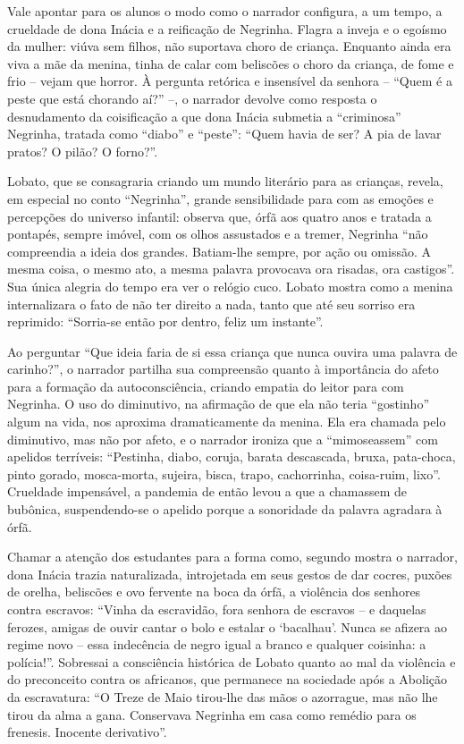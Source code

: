 \documentclass[12pt]{extarticle}
\begin{document}
Vale apontar para os alunos o modo como o narrador configura, a um
tempo, a crueldade de dona Inácia e a reificação de Negrinha. Flagra a
inveja e o egoísmo da mulher: viúva sem filhos, não suportava choro de
criança. Enquanto ainda era viva a mãe da menina, tinha de calar com
beliscões o choro da criança, de fome e frio -- vejam que horror. À
pergunta retórica e insensível da senhora -- ``Quem é a peste que está
chorando aí?'' --, o narrador devolve como resposta o desnudamento da
coisificação a que dona Inácia submetia a ``criminosa'' Negrinha,
tratada como ``diabo'' e ``peste'': ``Quem havia de ser? A pia de lavar
pratos? O pilão? O forno?''.

Lobato, que se consagraria criando um mundo literário para as crianças,
revela, em especial no conto ``Negrinha'', grande sensibilidade para com
as emoções e percepções do universo infantil: observa que, órfã aos
quatro anos e tratada a pontapés, sempre imóvel, com os olhos assustados
e a tremer, Negrinha ``não compreendia a ideia dos grandes. Batiam-lhe
sempre, por ação ou omissão. A mesma coisa, o mesmo ato, a mesma palavra
provocava ora risadas, ora castigos''. Sua única alegria do tempo era
ver o relógio cuco. Lobato mostra como a menina internalizara o fato de
não ter direito a nada, tanto que até seu sorriso era reprimido:
``Sorria-se então por dentro, feliz um instante''.

Ao perguntar ``Que ideia faria de si essa criança que nunca ouvira uma
palavra de carinho?'', o narrador partilha sua compreensão quanto à
importância do afeto para a formação da autoconsciência, criando empatia
do leitor para com Negrinha. O uso do diminutivo, na afirmação de que
ela não teria ``gostinho'' algum na vida, nos aproxima dramaticamente da
menina. Ela era chamada pelo diminutivo, mas não por afeto, e o narrador
ironiza que a ``mimoseassem'' com apelidos terríveis: ``Pestinha, diabo,
coruja, barata descascada, bruxa, pata-choca, pinto gorado, mosca-morta,
sujeira, bisca, trapo, cachorrinha, coisa-ruim, lixo''. Crueldade
impensável, a pandemia de então levou a que a chamassem de bubônica,
suspendendo-se o apelido porque a sonoridade da palavra agradara à órfã.

Chamar a atenção dos estudantes para a forma como, segundo mostra o
narrador, dona Inácia trazia naturalizada, introjetada em seus gestos de
dar cocres, puxões de orelha, beliscões e ovo fervente na boca da órfã,
a violência dos senhores contra escravos: ``Vinha da escravidão, fora
senhora de escravos -- e daquelas ferozes, amigas de ouvir cantar o bolo
e estalar o `bacalhau'. Nunca se afizera ao regime novo -- essa
indecência de negro igual a branco e qualquer coisinha: a polícia!''.
Sobressai a consciência histórica de Lobato quanto ao mal da violência e
do preconceito contra os africanos, que permanece na sociedade após a
Abolição da escravatura: ``O Treze de Maio tirou-lhe das mãos o
azorrague, mas não lhe tirou da alma a gana. Conservava Negrinha em casa
como remédio para os frenesis. Inocente derivativo''.
\end{document}
